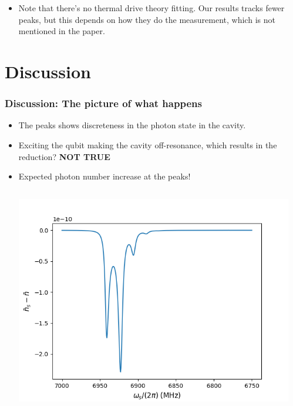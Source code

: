 \documentclass[12pt,hyperref={CJKbookmarks=true}]{beamer}
\begin{document}
\begin{frame}[t]
\begin{columns}
\begin{column}{0.6\linewidth}
\end{column}
\end{columns}
\begin{itemize}
	\item Note that there's no thermal drive theory fitting. 
	Our results tracks fewer peaks, but this depends on 
	how they do the measurement, which is not mentioned in the paper. 
\end{itemize}
\end{frame}

\section{Discussion}
\begin{frame}[t]\frametitle{Discussion: The picture of what happens}
\begin{itemize}
	\item The peaks shows discreteness in the photon state in the cavity. 
	\item Exciting the qubit making the cavity off-resonance, which results in
	the reduction? \pause \textbf{NOT TRUE} \pause
	\item Expected photon number increase at the peaks!
\begin{columns}
\begin{column}{0.5\linewidth}
    \centering
    \includegraphics[width=\linewidth]{figure/nbar_1.png}
\end{column}%
\begin{column}{0.5\linewidth}
	\centering

\end{column}
\end{columns}
\end{itemize}
\end{frame}
\end{document}

